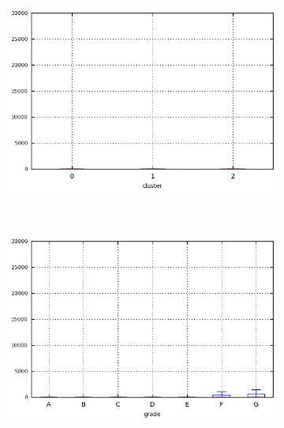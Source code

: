 \begin{anexosenv}
\begin{figure}[ht!]
\begin{subfigure}[t]{0.45\textwidth}
        \end{subfigure}
\end{figure}



\begin{figure}[ht!]
    \centering
                \caption{\emph{Boxplots} de recoveries}
        \begin{subfigure}[t]{0.45\textwidth}
            \centering

            \centerline{\includegraphics[width=1.05\textwidth]{img/recoveries_by_cluster}}
        \end{subfigure}%
        ~ 
        \begin{subfigure}[t]{0.45\textwidth}
            \centering
   
            \centerline{\includegraphics[width=1.05\textwidth]{img/recoveries_by_grade}}


\end{subfigure}
\end{figure}
\end{anexosenv}
